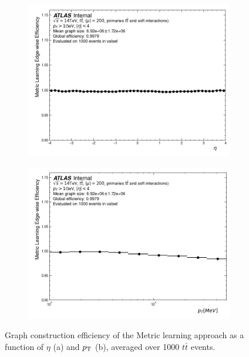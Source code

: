 \begin{figure}[h!]
\begin{subfigure}[b]{0.49\textwidth}
    \centering
    \includegraphics[width=\textwidth]{figures/metric_learning_eff_eta.png}
    \caption{}
    \label{subfig:metric-learning-eff-eta}
\end{subfigure}
\begin{subfigure}[b]{0.49\textwidth}
    \centering
    \includegraphics[width=\textwidth]{figures/metric_learning_eff_pt.png}
    \caption{}
    \label{subfig:metric-learning-eff-pt}
\end{subfigure}
\caption{Graph construction efficiency of the Metric learning approach as a function of $\eta$ (a) and $p_{\text{T}}$ (b), averaged over 1000 $t\bar{t}$ events. }
\label{fig:metric-learning-efficiency}
\end{figure}

